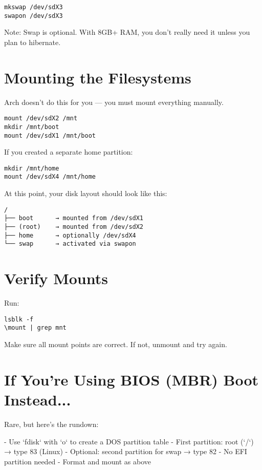 \documentclass[12pt]{book}
\begin{document}
\begin{lstlisting}
mkswap /dev/sdX3
swapon /dev/sdX3
\end{lstlisting}

Note: Swap is optional. With 8GB+ RAM, you don’t really need it unless you plan to hibernate.

\section{Mounting the Filesystems}

Arch doesn't do this for you — you must mount everything manually.

\begin{lstlisting}
mount /dev/sdX2 /mnt
mkdir /mnt/boot
mount /dev/sdX1 /mnt/boot
\end{lstlisting}

If you created a separate home partition:

\begin{lstlisting}
mkdir /mnt/home
mount /dev/sdX4 /mnt/home
\end{lstlisting}

At this point, your disk layout should look like this:

\begin{lstlisting}
/
├── boot      → mounted from /dev/sdX1
├── (root)    → mounted from /dev/sdX2
├── home      → optionally /dev/sdX4
└── swap      → activated via swapon
\end{lstlisting}

\section{Verify Mounts}

Run:

\begin{lstlisting}
lsblk -f
\mount | grep mnt
\end{lstlisting}

Make sure all mount points are correct. If not, unmount and try again.

\section{If You’re Using BIOS (MBR) Boot Instead...}

Rare, but here’s the rundown:

- Use `fdisk` with `o` to create a DOS partition table
- First partition: root (`/`) → type 83 (Linux)
- Optional: second partition for swap → type 82
- No EFI partition needed
- Format and mount as above
\end{document}
